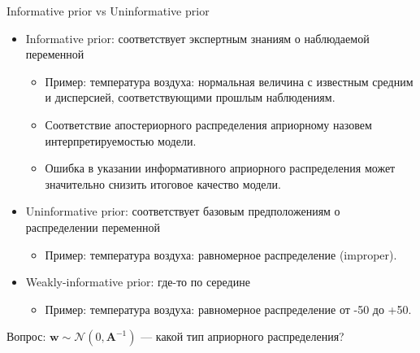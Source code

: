 \documentclass[usenames,dvipsnames,10pt,pdf,utf8,russian,aspectratio=43]{beamer}
\begin{document}
\begin{frame}{Informative prior vs Uninformative prior}
\begin{itemize}
\item Informative prior: соответствует экспертным знаниям о наблюдаемой переменной 
\begin{itemize}
\item Пример: температура воздуха: нормальная величина с известным средним и дисперсией, соответствующими прошлым наблюдениям.
\item Соответствие апостериорного распределения априорному назовем интерпретируемостью модели.
\item Ошибка в указании информативного априорного распределения может значительно снизить итоговое качество модели.
\end{itemize}

\item Uninformative prior: соответствует базовым предположениям о распределении переменной
\begin{itemize}
\item Пример: температура воздуха: равномерное распределение (improper).
\end{itemize}

\item Weakly-informative prior: где-то по середине
\begin{itemize}
\item Пример: температура воздуха: равномерное распределение от -50 до +50.
\end{itemize}


\end{itemize}
Вопрос: $\mathbf{w} \sim \mathcal{N}(0, \mathbf{A}^{-1})$ --- какой тип априорного распределения?


\end{frame}
\end{document}
